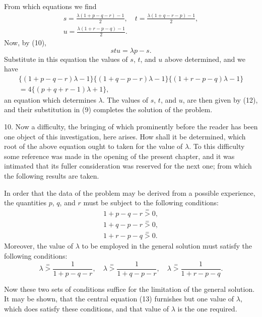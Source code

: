 \documentclass[oneside]{book}
\begin{document}
From which equations we find
\begin{gather*}
  s = \frac{\lambda(1 + p - q - r) - 1}{2},  \quad
  t = \frac{\lambda(1 + q - r - p) - 1}{2},  \\
  u = \frac{\lambda(1 + r - p - q) - 1}{2}.  \tag{12}
\end{gather*}
Now, by (10),
\[
  stu = \lambda p - s.
\]
Substitute in this equation the values of $s$, $t$, and $u$ above determined, and we have
\begin{multline*}
  \{(1 + p - q - r)\lambda - 1\}
  \{(1 + q - p - r)\lambda - 1\}
  \{(1 + r - p - q)\lambda - 1\}\\
=4\{(p + q + r - 1)\lambda + 1\}, \tag{13}
\end{multline*}
an equation which determines $\lambda$. The values of $s$, $t$, and $u$, are
then given by (12), and their substitution in (9) completes the
solution of the problem.

10. Now a difficulty, the bringing of which prominently before
the reader has been one object of this investigation, here
arises. How shall it be determined, which root of the above
equation ought to taken for the value of $\lambda$. To this difficulty
some reference was made in the opening of the present chapter,
and it was intimated that its fuller consideration was reserved for
the next one; from which the following results are taken.

In order that the data of the problem may be derived from
a possible experience, the quantities $p$, $q$, and $r$ must be subject
to the following conditions:
\[
\begin{aligned}
  1 + p - q - r \stackrel{=}{>} 0,   \\
  1 + q - p - r \stackrel{=}{>} 0,   \\
  1 + r - p - q \stackrel{=}{>} 0.
\end{aligned}                        \tag{14}
\]
Moreover, the value of $\lambda$ to be employed in the general solution
must satisfy the following conditions:
\[
  \lambda \stackrel{=}{>} \frac{1}{1 + p - q - r}, \quad
  \lambda \stackrel{=}{>} \frac{1}{1 + q - p - r}, \quad
  \lambda \stackrel{=}{>} \frac{1}{1 + r - p - q}.      \tag{15}
\]

Now these two sets of conditions suffice for the limitation of
the general solution. It may be shown, that the central equation
(13) furnishes but one value of $\lambda$, which does satisfy these conditions,
and that value of $\lambda$ is the one required.
\end{document}
